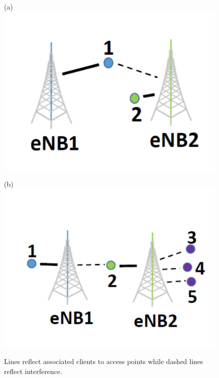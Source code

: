 \begin{figure}[htb!]
  \begin{minipage}{0.23\textwidth}
    \centering
    (a)
    \vfill
    \includegraphics[width=\textwidth,height=0.6\columnwidth]{./figs/over.pdf}
  \end{minipage}
  \begin{minipage}{0.23\textwidth}
    \centering
    (b)
    \vfill
  \includegraphics[width=\textwidth,height=0.6\columnwidth]{./figs/under.pdf}
  \end{minipage}
  \hfill
  \caption{Lines reflect associated clients to access points while dashed lines reflect interference. }
  \label{fig:asym}
\end{figure}


